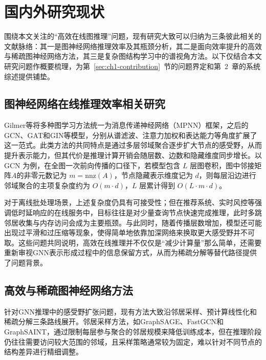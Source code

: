\section{国内外研究现状}
\label{sec:ch1-related}

围绕本文关注的“高效在线图推理”问题，现有研究大致可以归纳为三条彼此相关的文献脉络：其一是图神经网络推理效率及其瓶颈分析，其二是面向效率提升的高效与稀疏图神经网络方法，其三是复杂图结构学习中的谱视角方法。以下仅结合本文研究问题作概要梳理，为第~\ref{sec:ch1-contribution}~节的问题界定和第~2~章的系统综述提供铺垫。

\subsection{图神经网络在线推理效率相关研究}
\label{subsec:ch1-gnn-efficiency}

Gilmer等\cite{Gilmer2017MPNN}\label{idx:name:gilmer}将多种图学习方法统一为消息传递神经网络（MPNN）框架，之后的GCN\cite{Kipf2017GCN}\label{idx:name:gcn}、GAT\cite{Velickovic2018GAT}\label{idx:name:gat}和GIN\cite{Xu2019GIN}\label{idx:name:gin}等模型，分别从谱滤波、注意力加权和表达能力等角度扩展了这一范式。此类方法的共同特点是通过多层邻域聚合逐步扩大节点的感受野，从而提升表示能力，但其代价是推理计算开销会随层数、边数和隐藏维度同步增长。以 GCN 为例，在全图一次前向传播的口径下，若模型包含 $L$ 层图卷积，图中邻接矩阵$A$的非零元数记为 $m=\mathrm{nnz}(A)$，节点隐藏表示维度记为 $d$，则每层沿边进行邻域聚合的主项复杂度约为 $O(m\cdot d)$，$L$ 层累计得到 $O(L\cdot m\cdot d)$。

对于离线批处理场景，上述复杂度仍具有可接受性；但在推荐系统、实时风控等强调低时延响应的在线服务中，目标往往是对少量查询节点快速完成推理，此时多跳邻居收集与内存访问会成为主要瓶颈。与此同时，随着传播层数增加，模型还可能出现过平滑\label{idx:theme:oversmooth}\cite{Li2018OverSmoothing}和过压缩\label{idx:theme:oversquash}\cite{Alon2021OverSquashing}等现象，使得简单地依靠加深网络来换取更大感受野并不可取。这些问题共同说明，高效在线推理并不仅仅是“减少计算量”那么简单，还需要重新审视GNN表示形成过程中的信息保留方式，从而为稀疏分解等替代路径提供了问题背景。

\subsection{高效与稀疏图神经网络方法}
\label{subsec:ch1-sparse}

针对GNN推理中的感受野扩张问题，现有方法大致沿邻居采样、预计算线性化和稀疏分解三条路线展开。邻居采样方法，如GraphSAGE\cite{Hamilton2017GraphSAGE}\label{idx:name:graphsage}、FastGCN\cite{Chen2018FastGCN}\label{idx:name:fastgcn}和GraphSAINT\cite{Zeng2020GraphSAINT}\label{idx:name:graphsaint}，通过限制每层参与聚合的邻居规模来降低训练成本，但在推理阶段仍往往需要访问较大范围的邻域，且采样策略通常较为固定，难以针对不同节点的结构差异进行精细调整。

